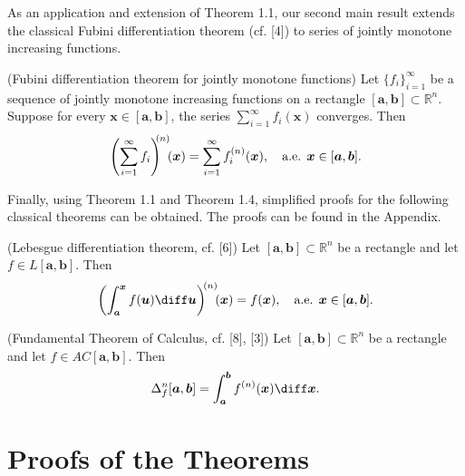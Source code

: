 \documentclass{ijclclp}
\begin{document}
As an application and extension of Theorem 1.1, our second main result extends the classical Fubini differentiation theorem (cf. [4]) to series of jointly monotone increasing functions. 

\begin{theorem}{(Fubini differentiation theorem for jointly monotone functions)}
    Let \(\{f_i\}_{i=1}^\infty\) be a sequence of jointly monotone increasing functions on a rectangle \([\boldsymbol{a},\boldsymbol{b}]\subset\mathbb R^n\). Suppose for every \(\boldsymbol{x}\in[\boldsymbol{a},\boldsymbol{b}]\), the series \(\sum\limits_{i=1}^{\infty}f_{i}(\boldsymbol{x})\) converges. Then 
    \[\left(\sum_{i=1}^{\infty} f_{i}\right)^{\hspace{-0.4em}(n)}\hspace{-0.4em}(\boldsymbol{x})= \sum_{i=1}^{\infty} f_{i}^{(n)}(\boldsymbol{x}),\quad\text{a.e. }\boldsymbol{x}\in[\boldsymbol{a},\boldsymbol{b}].\]
\end{theorem}

Finally, using Theorem 1.1 and Theorem 1.4, simplified proofs for the following classical theorems can be obtained. The proofs can be found in the Appendix. 

\begin{corollary}{(Lebesgue differentiation theorem, cf. [6])}
    Let \([\boldsymbol{a},\boldsymbol{b}]\subset\mathbb R^n\) be a rectangle and let \(f\in L[\boldsymbol{a},\boldsymbol{b}]\). Then 
    \begin{equation}
        \left(\int_{\boldsymbol{a}}^{\boldsymbol{x}}f(\boldsymbol{u})\diff \boldsymbol{u}\right)^{\hspace{-0.2em}(n)}\hspace{-0.4em}(\boldsymbol{x})=f(\boldsymbol{x}),\quad\text{a.e. }\boldsymbol{x}\in[\boldsymbol{a},\boldsymbol{b}].
    \end{equation}
\end{corollary}
\begin{corollary}{(Fundamental Theorem of Calculus, cf. [8], [3])}
    Let \([\boldsymbol{a},\boldsymbol{b}]\subset\mathbb R^n\) be a rectangle and let \(f\in AC[\boldsymbol{a},\boldsymbol{b}]\). Then 
    \begin{equation}
        \Delta_f^n[\boldsymbol{a},\boldsymbol{b}]=\int_{\boldsymbol{a}}^{\boldsymbol{b}}f^{(n)}(\boldsymbol{x})\diff \boldsymbol{x}.
    \end{equation}
\end{corollary}

\section{Proofs of the Theorems}
\end{document}
